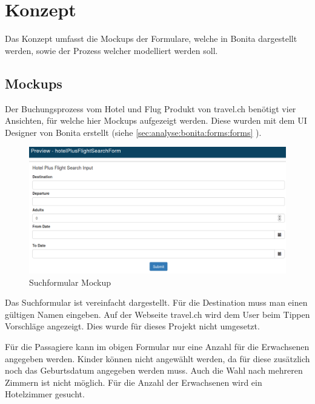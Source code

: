 
\chapter{Konzept}
\label{sec:konzept}
Das Konzept umfasst die Mockups der Formulare, welche in Bonita dargestellt werden, sowie der Prozess welcher modelliert werden soll.

\section{Mockups}
\label{sec:konzept:mockups}
Der Buchungsprozess vom Hotel und Flug Produkt von travel.ch benötigt vier Ansichten, für welche hier Mockups aufgezeigt werden.
Diese wurden mit dem UI Designer von Bonita erstellt (siehe \cref{sec:analyse:bonita:forms:forms} ).

\begin{figure}[H]
	\centering
	\includegraphics[width=1\textwidth]{images/forms-search.png}
	\caption{Suchformular Mockup}
	\label{fig:konzept:mockups:search}
\end{figure}

Das Suchformular ist vereinfacht dargestellt. Für die Destination muss man einen gültigen Namen eingeben. Auf der Webseite travel.ch wird dem User beim Tippen Vorschläge angezeigt. Dies wurde für dieses Projekt nicht umgesetzt.

Für die Passagiere kann im obigen Formular nur eine Anzahl für die Erwachsenen angegeben werden. Kinder können nicht angewählt werden, da für diese zusätzlich noch das Geburtsdatum angegeben werden muss. Auch die Wahl nach mehreren Zimmern ist nicht möglich. Für die Anzahl der Erwachsenen wird ein Hotelzimmer gesucht.

